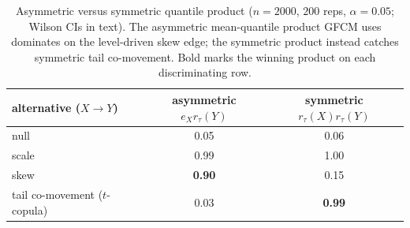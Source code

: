 \begin{table}[ht]\centering
\begin{tabular}{lcc}
\toprule
alternative ($X\!\to\!Y$) & asymmetric $e_X r_\tau(Y)$ & symmetric $r_\tau(X) r_\tau(Y)$ \\
\midrule
null & 0.05 & 0.06 \\
scale & 0.99 & 1.00 \\
skew & \textbf{0.90} & 0.15 \\
tail co-movement ($t$-copula) & 0.03 & \textbf{0.99} \\
\bottomrule
\end{tabular}
\caption{Asymmetric versus symmetric quantile product ($n=2000$, $200$ reps, $\alpha=0.05$; Wilson CIs in text). The asymmetric mean-quantile product GFCM uses dominates on the level-driven skew edge; the symmetric product instead catches symmetric tail co-movement. Bold marks the winning product on each discriminating row.}
\label{tab:asym}
\end{table}
